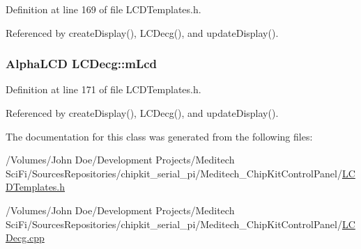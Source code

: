Definition at line 169 of file L\-C\-D\-Templates.\-h.



Referenced by create\-Display(), L\-C\-Decg(), and update\-Display().

\hypertarget{class_l_c_decg_aca5f4b83f22c46ed313265f02feebb2a}{
\subsubsection[{m\-Lcd}]{\setlength{\rightskip}{0pt plus 5cm}Alpha\-L\-C\-D L\-C\-Decg\-::m\-Lcd\hspace{0.3cm}{\ttfamily [private]}}}\label{class_l_c_decg_aca5f4b83f22c46ed313265f02feebb2a}


Definition at line 171 of file L\-C\-D\-Templates.\-h.



Referenced by create\-Display(), L\-C\-Decg(), and update\-Display().



The documentation for this class was generated from the following files\-:\begin{DoxyCompactItemize}
\item 
/\-Volumes/\-John Doe/\-Development Projects/\-Meditech Sci\-Fi/\-Sources\-Repositories/chipkit\-\_\-serial\-\_\-pi/\-Meditech\-\_\-\-Chip\-Kit\-Control\-Panel/\hyperlink{_l_c_d_templates_8h}{L\-C\-D\-Templates.\-h}\item 
/\-Volumes/\-John Doe/\-Development Projects/\-Meditech Sci\-Fi/\-Sources\-Repositories/chipkit\-\_\-serial\-\_\-pi/\-Meditech\-\_\-\-Chip\-Kit\-Control\-Panel/\hyperlink{_l_c_decg_8cpp}{L\-C\-Decg.\-cpp}\end{DoxyCompactItemize}

